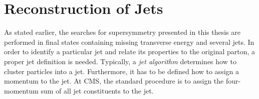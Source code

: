 \section{Reconstruction of Jets}
\label{sec:jets_reco}
As stated earlier, the searches for supersymmetry presented in this thesis are performed in final states containing missing transverse energy and several jets. %
In order to identify a particular jet and relate its properties to the original parton, a proper jet definition is needed. Typically, a \textit{jet algorithm} determines how to cluster particles into a jet. Furthermore, it has to be defined how to assign a momentum to the jet. At CMS, the standard procedure is to assign the four-momentum sum of all jet constituents to the jet. 
